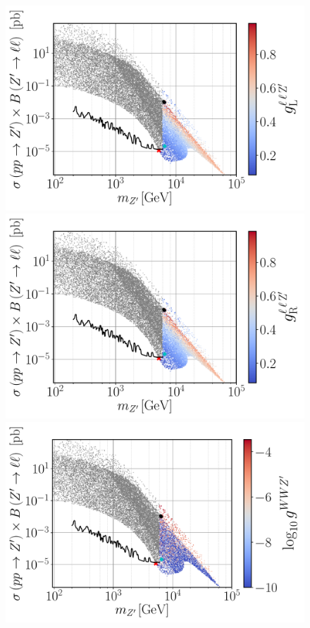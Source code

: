\documentclass[10pt]{report}
\begin{document}
\begin{figure}[!htb]
	\centering
	\includegraphics[scale=0.37]{Images/BLSM_2/mZp_Xsec_gLmumuZ.pdf}
	\includegraphics[scale=0.37]{Images/BLSM_2/mZp_Xsec_gRmumuZ.pdf}
	\includegraphics[scale=0.37]{Images/BLSM_2/mZp_Xsec_gWWZp.pdf}

\end{figure}
\end{document}
